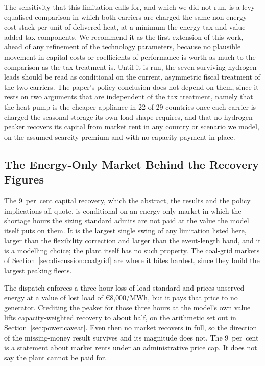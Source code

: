 The sensitivity that this limitation calls for, and which we did not run, is a
levy-equalised comparison in which both carriers are charged the same non-energy
cost stack per unit of delivered heat, at a minimum the energy-tax and
value-added-tax components. We recommend it as the first extension of this work,
ahead of any refinement of the technology parameters, because no plausible
movement in capital costs or coefficients of performance is worth as much to the
comparison as the tax treatment is. Until it is run, the seven surviving hydrogen
leads should be read as conditional on the current, asymmetric fiscal treatment of
the two carriers. The paper's policy conclusion does not depend on them, since it
rests on two arguments that are independent of the tax treatment, namely that the
heat pump is the cheaper appliance in 22 of 29 countries once each carrier is
charged the seasonal storage its own load shape requires, and that no hydrogen
peaker recovers its capital from market rent in any country or scenario we model, on
the assumed scarcity premium and with no capacity payment in place.

\subsection{The Energy-Only Market Behind the Recovery Figures}
\label{sec:limitations:energyonly}

The 9~per~cent capital recovery, which the abstract, the results and the policy
implications all quote, is conditional on an energy-only market in which the shortage
hours the sizing standard admits are not paid at the value the model itself puts on them.
It is the largest single swing of any limitation listed here, larger than the
flexibility correction and larger than the event-length band, and it is a modelling choice; the plant itself has no such property. The coal-grid markets of
Section~\ref{sec:discussion:coalgrid} are where it bites hardest, since they build the
largest peaking fleets.

The dispatch enforces a three-hour loss-of-load standard and prices unserved energy at a
value of lost load of \euro{}8{,}000/MWh, but it pays that price to no generator.
Crediting the peaker for those three hours at the model's own value lifts
capacity-weighted recovery to about half, on the arithmetic set out in
Section~\ref{sec:power:caveat}. Even then no market recovers in full, so the direction
of the missing-money result survives and its magnitude does not. The 9~per~cent is a statement about market rents under an administrative price cap. It
does not say the plant cannot be paid for.

